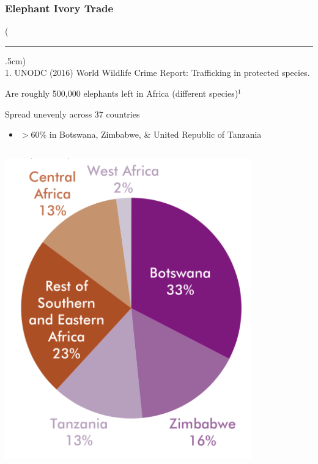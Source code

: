 \documentclass[10pt]{beamer}
\newenvironment{reference}[2]{%
	\begin{textblock*}{\textwidth}(#1,#2)
		\tiny\bgroup\color{gray}}{\egroup\end{textblock*}}
\begin{document}
\begin{frame}[t]
\frametitle{Elephant Ivory Trade}
\vspace{0.25cm}

	\begin{reference}{4mm}{92mm}
		\rule{1.5cm}{0.25pt}\\
		1. UNODC (2016) World Wildlife Crime Report: Trafficking in protected species.
	\end{reference}

	Are roughly 500,000 elephants left in Africa (different species)$^{1}$\\
	
	\vspace{0.25cm}
	
	Spread unevenly across 37 countries\\
		\medskip
		\begin{itemize}
			\item $>$60\% in Botswana, Zimbabwe, \& United Republic of Tanzania\\
		\end{itemize}
	
	\vspace{0.25cm}
	
	\begin{columns}
		\begin{column}{0.5\textwidth}
			\begin{center}
				\includegraphics[width=0.8\textwidth]{figures/eCountries1.png}	
			\end{center}
		\end{column}
		

\end{columns}
\end{frame}
\end{document}
